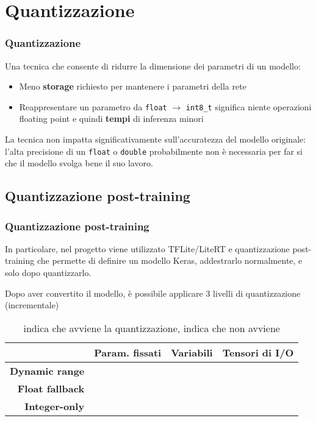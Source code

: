 \documentclass{beamer}
\newcommand{\dflvspace}{\vspace{10pt}}
\newcommand{\nocross}{{\color{red} \ding{55}}}
\newcommand{\okmark}{{\color{softgreen} \ding{51}}}
\begin{document}
\section{Quantizzazione}
\begin{frame}
	\frametitle{Quantizzazione}
	
	Una tecnica che consente di ridurre la dimensione dei parametri di un modello:
	\begin{itemize}
		\item Meno \textbf{storage} richiesto per mantenere i parametri della rete
		\item Reappresentare un parametro da \texttt{float} $\rightarrow$ \texttt{int8\_t} significa niente
		operazioni floating point e quindi \textbf{tempi} di inferenza minori
	\end{itemize}
	
	\dflvspace
	
	La tecnica non impatta significativamente sull'accuratezza del modello originale: l'alta precisione
	di un \texttt{float} o \texttt{double} probabilmente non è necessaria per far si che il modello
	svolga bene il suo lavoro.
	
\end{frame}

\subsection{Quantizzazione post-training}
\begin{frame}
	\frametitle{Quantizzazione post-training}
	
	In particolare, nel progetto viene utilizzato TFLite/LiteRT e
	quantizzazione post-training che permette di definire un modello Keras, 
	addestrarlo normalmente, e solo dopo quantizzarlo.
	
	\dflvspace
	
	Dopo aver convertito il modello, è possibile applicare 
	3 livelli di quantizzazione (incrementale)
	
	\dflvspace
	
	\begin{center}
	\begin{table}
	\begin{tabular}{|r|c|c|c|}
	\hline
	& \textbf{Param. fissati} & \textbf{Variabili} & \textbf{Tensori di I/O} \\
	\hline
	\hline
	\textbf{Dynamic range} & \okmark & \nocross & \nocross \\
	\hline
	\textbf{Float fallback} & \okmark & \okmark & \nocross \\
	\hline
	\textbf{Integer-only} & \okmark & \okmark & \okmark \\
	\hline
	\end{tabular}
	\caption{\okmark\;indica che avviene la quantizzazione, \nocross\;indica che non avviene}
	\end{table}
	\end{center}
	
\end{frame}
\end{document}
